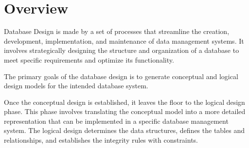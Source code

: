 \documentclass[../../DD.tex]{subfiles}
\begin{document}
\section{Overview}
Database Design is made by a set of processes that streamline the creation, development, implementation, and maintenance of data management systems. It involves strategically designing the structure and organization of a database to meet specific requirements and optimize its functionality.

The primary goals of the database design is to generate conceptual and logical design models for the intended database system. 

Once the conceptual design is established, it leaves the floor to the logical design phase. This phase involves translating the conceptual model into a more detailed representation that can be implemented in a specific database management system. The logical design determines the data structures, defines the tables and relationships, and establishes the integrity rules with constraints.

	
\end{document}
